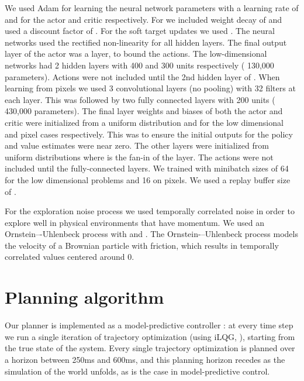 \documentclass{article} \usepackage{iclr2016_conference,times}
\begin{document}
We used Adam \citep{kingma2014adam} for learning the neural network
parameters with a learning rate of  and  for
the actor and critic respectively. For  we included  weight
decay of  and used a discount factor of . For
the soft target updates we used .  The neural networks
used the rectified non-linearity \citep{glorot2011deep} for all hidden
layers. The final output layer of the actor was a  layer, to bound
the actions. The low-dimensional networks had 2 hidden layers with 400 and
300 units respectively ( 130,000 parameters).  Actions were
not included until the 2nd hidden layer of . When learning from
pixels we used 3 convolutional layers (no pooling) with 32 filters at
each layer. This was followed by two fully connected layers with 200
units ( 430,000 parameters).
The final layer weights and biases
of both the actor and critic were initialized from a uniform
distribution  and
 for the low dimensional and pixel
cases respectively. This was to ensure the initial outputs for the policy
and value estimates were near zero. The other layers were initialized from uniform
distributions  where  is the fan-in
of the layer.
The actions were not included
until the fully-connected layers. We trained with minibatch sizes of 64
for the low dimensional problems and 16 on pixels. We used a replay buffer size
of .

For the exploration noise process we used temporally correlated noise
in order to explore well in physical environments that have momentum.
We used an Ornstein–-Uhlenbeck process \citep{uhlenbeck1930theory}
with  and
. The Ornstein-–Uhlenbeck
process models the velocity of a Brownian particle with friction,
which results in temporally correlated values centered around 0.







\section{Planning algorithm}
Our planner is implemented as a model-predictive controller
\citep{tassa2012synthesis}: at every time step we run a single iteration of
trajectory optimization (using iLQG, \citep{todorov2005generalized}), starting
from the true state of the system.
Every single trajectory optimization is planned over a horizon between
250ms and 600ms, and this planning horizon recedes as the simulation of
the world unfolds, as is the case in model-predictive control.
\end{document}
